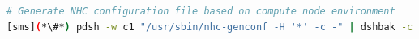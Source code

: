 \begin{lstlisting}[language=bash,keywords={},upquote=true]
# Generate NHC configuration file based on compute node environment
[sms](*\#*) pdsh -w c1 "/usr/sbin/nhc-genconf -H '*' -c -" | dshbak -c

\end{lstlisting}

